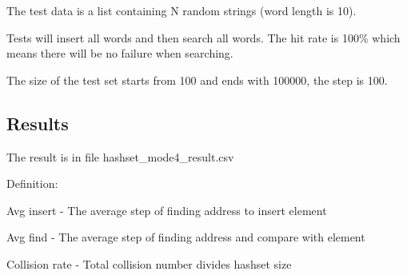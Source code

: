 \documentclass[a4]{article}
\begin{document}
\noindent The test data is a list containing N random strings (word length is 10).

\noindent Tests will insert all words and then search all words. The hit rate is 100\% which means there will be no failure when searching.

\noindent The size of the test set starts from 100 and ends with 100000, the step is 100.



\subsection{Results}

The result is in file hashset\_mode4\_result.csv

Definition:

Avg insert - The average step of finding address to insert element

Avg find - The average step of finding address and compare with element

Collision rate - Total collision number divides hashset size
\\
\end{document}
